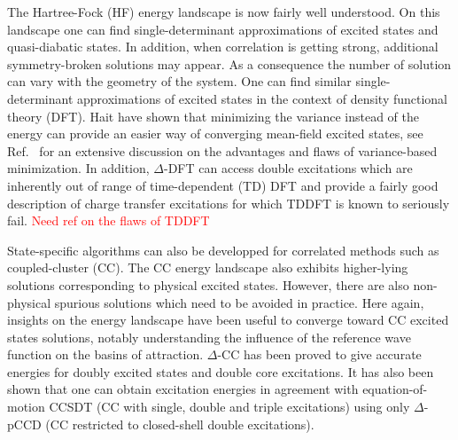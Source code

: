\documentclass[aps,prb,reprint,showkeys,superscriptaddress]{revtex4-1}
\newcommand{\todo}[1]{\textcolor{red}{#1}}
\begin{document}
The Hartree-Fock (HF) \cite{Szabo_1996} energy landscape is now fairly well understood.\cite{Thompson_2018,Dong_2020,Burton_2021}
On this landscape one can find single-determinant approximations of excited states \cite{Gilbert_2008,Barca_2014} and quasi-diabatic states. \cite{Thom_2009}
In addition, when correlation is getting strong, additional symmetry-broken solutions may appear.\cite{Coulson_1949}
As a consequence the number of solution can vary with the geometry of the system.
One can find similar single-determinant approximations of excited states in the context of density functional theory (DFT). \cite{Hait_2020,Hait_2021}
Hait \etal have shown that minimizing the variance instead of the energy can provide an easier way of converging mean-field excited states, \cite{Hait_2020} see Ref.~ for an extensive discussion on the advantages and flaws of variance-based minimization.
In addition, $\Delta$-DFT can access double excitations which are inherently out of range of time-dependent (TD) DFT \cite{Hait_2021} and provide a fairly good description of charge transfer excitations for which TDDFT is known to seriously fail. \cite{Hait_2021} \todo{Need ref on the flaws of TDDFT}

State-specific algorithms can also be developped for correlated methods such as coupled-cluster (CC). \cite{Shavitt_2009}
The CC energy landscape also exhibits higher-lying solutions corresponding to physical excited states. \cite{Jankowski_1994,Jankowski_1994a,Piecuch_2000,Mayhall_2010,Lee_2019,Kossoski_2021}
However, there are also non-physical spurious solutions which need to be avoided in practice. \cite{Jankowski_1994,Jankowski_1994a,Piecuch_2000,Mayhall_2010,Kossoski_2021,Marie_2021a}
Here again, insights on the energy landscape have been useful to converge toward CC excited states solutions, notably understanding the influence of the reference wave function on the basins of attraction. \cite{Jankowski_1995,Lee_2019,Marie_2021a}
$\Delta$-CC has been proved to give accurate energies for doubly excited states and double core excitations. \cite{Lee_2019}
It has also been shown that one can obtain excitation energies in agreement with equation-of-motion CCSDT (CC with single, double and triple excitations) using only $\Delta$-pCCD (CC restricted to closed-shell double excitations). \cite{Kossoski_2021}
\end{document}
